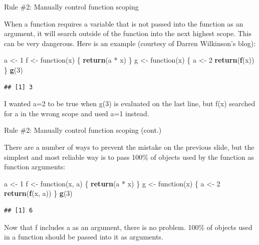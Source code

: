 \documentclass[10pt,ignorenonframetext,]{beamer}
\newenvironment{Shaded}{\begin{snugshade}}{\end{snugshade}}
\newcommand{\KeywordTok}[1]{\textcolor[rgb]{0.13,0.29,0.53}{\textbf{{#1}}}}
\newcommand{\DecValTok}[1]{\textcolor[rgb]{0.00,0.00,0.81}{{#1}}}
\newcommand{\StringTok}[1]{\textcolor[rgb]{0.31,0.60,0.02}{{#1}}}
\newcommand{\NormalTok}[1]{{#1}}
\begin{document}
\begin{frame}[fragile]{Rule \#2: Manually control function scoping}

When a function requires a variable that is not passed into the function
as an argument, it will search outside of the function into the next
highest scope. This can be very dangerous. Here is an example (courtesy
of Darren Wilkinson's blog):

\footnotesize

\begin{Shaded}
\begin{Highlighting}[]
\NormalTok{a <-}\StringTok{ }\DecValTok{1}
\NormalTok{f <-}\StringTok{ }\NormalTok{function(x) \{}
  \KeywordTok{return}\NormalTok{(a *}\StringTok{ }\NormalTok{x)}
\NormalTok{\}}
\NormalTok{g <-}\StringTok{ }\NormalTok{function(x) \{}
  \NormalTok{a <-}\StringTok{ }\DecValTok{2}
  \KeywordTok{return}\NormalTok{(}\KeywordTok{f}\NormalTok{(x))}
\NormalTok{\}}
\KeywordTok{g}\NormalTok{(}\DecValTok{3}\NormalTok{)}
\end{Highlighting}
\end{Shaded}

\begin{verbatim}
## [1] 3
\end{verbatim}

\normalsize

I wanted a=2 to be true when g(3) is evaluated on the last line, but
f(x) searched for a in the wrong scope and used a=1 instead.

\end{frame}

\begin{frame}[fragile]{Rule \#2: Manually control function scoping
(cont.)}

There are a number of ways to prevent the mistake on the previous slide,
but the simplest and most reliable way is to pass 100\% of objects used
by the function as function arguments:

\footnotesize

\begin{Shaded}
\begin{Highlighting}[]
\NormalTok{a <-}\StringTok{ }\DecValTok{1}
\NormalTok{f <-}\StringTok{ }\NormalTok{function(x, a) \{}
  \KeywordTok{return}\NormalTok{(a *}\StringTok{ }\NormalTok{x)}
\NormalTok{\}}
\NormalTok{g <-}\StringTok{ }\NormalTok{function(x) \{}
  \NormalTok{a <-}\StringTok{ }\DecValTok{2}
  \KeywordTok{return}\NormalTok{(}\KeywordTok{f}\NormalTok{(x, a))}
\NormalTok{\}}
\KeywordTok{g}\NormalTok{(}\DecValTok{3}\NormalTok{)}
\end{Highlighting}
\end{Shaded}

\begin{verbatim}
## [1] 6
\end{verbatim}

\normalsize
Now that f includes a as an argument, there is no problem. 100\% of
objects used in a function should be passed into it as arguments.

\end{frame}
\end{document}
